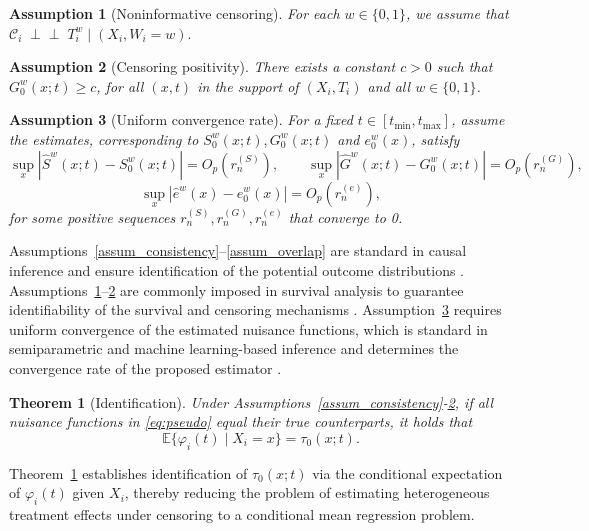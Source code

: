 \documentclass{article}
\newtheorem{theorem}{Theorem}
\newcommand{\E}{\mathbb{E}}
\newtheorem{assumption}{Assumption}
\newcommand{\indep}{\mathrel{\perp\!\!\!\perp}}
\begin{document}
\begin{assumption}[Noninformative censoring]\label{assum_indep_censoring}
For each $w \in \{0,1\}$, we assume that
\(
\mathcal C_i \;\indep\; T_i^w \mid (X_i, W_i = w).
\)
\end{assumption}

\begin{assumption}[Censoring positivity]\label{assum_positivity}
There exists a constant $c > 0$ such that \(
G_0^w(x; t) \ge c
\), for all $(x,t)$ in the support of $(X_i,T_i)$ and all $w \in \{0,1\}$.
 
\end{assumption}

\begin{assumption}[Uniform convergence rate]\label{assum_uni_consistency} For a fixed $t \in [t_{\min}, t_{\max}]$, assume the estimates, corresponding to $S_0^w(x;t), G_0^w(x;t) $ and $e_0^w(x)$,
satisfy
    \[
    \sup_x |\hat S^w(x;t)-S_0^w(x;t)|=O_p(r_n^{(S)}), \qquad
    \sup_x |\hat G^w(x;t)-G_0^w(x;t)|=O_p(r_n^{(G)}),
    \]
    \[
    \sup_x |\hat e^w(x)-e_0^w(x)|=O_p(r_n^{(e)}),
    \]
    for some positive sequences $r_n^{(S)},
r_n^{(G)}, r_n^{(e)}$ that converge to 0.
    
\end{assumption}

Assumptions~\ref{assum_consistency}--\ref{assum_overlap} are standard in causal inference and ensure identification of the potential outcome distributions \citep{rosenbaum1983propensity, imbens2015causal}. Assumptions~\ref{assum_indep_censoring}--\ref{assum_positivity} are commonly imposed in survival analysis to guarantee identifiability of the survival and censoring mechanisms \citep{andersen1982cox, tsiatis2006semiparametric}. Assumption~\ref{assum_uni_consistency} requires uniform convergence of the estimated nuisance functions, which is standard in semiparametric and machine learning-based inference and determines the convergence rate of the proposed estimator \citep{vanderVaart1998, chernozhukov2018dml}.

 

\begin{theorem}[Identification]\label{thm:ID}
Under Assumptions~\ref{assum_consistency}-\ref{assum_positivity}, if all nuisance functions in \eqref{eq:pseudo} equal their true counterparts, it holds that
\[
\E\{\varphi_i(t)\mid X_i=x\}=\tau_0(x;t).
\]
\end{theorem}

 Theorem~\ref{thm:ID}  establishes identification of $\tau_0(x;t)$ via the conditional expectation of $\varphi_i(t)$ given $X_i$, thereby reducing the problem of estimating heterogeneous treatment effects under censoring to a conditional mean regression problem.
 
\end{document}
